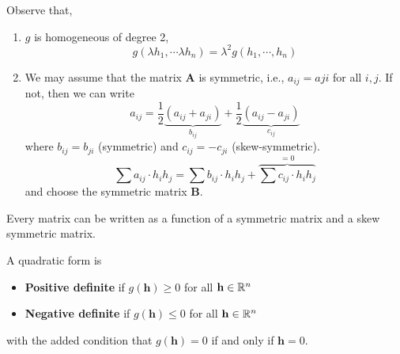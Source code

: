 \begin{prop}
    Observe that,
    \begin{enumerate}
        \item $g$ is homogeneous of degree 2,
        \[g(\lambda h_1, \cdots \lambda h_n) = \lambda^2 g(h_1, \cdots, h_n)\]
        \item We may assume that the matrix $\mathbf{A}$ is symmetric, i.e., $a_{ij} = a{ji}$ for all $i, j$. If not, then we can write
        \[a_{ij} = \frac{1}{2}\underbrace{(a_{ij} + a_{ji})}_{b_{ij}} + \frac{1}{2}\underbrace{(a_{ij} - a_{ji})}_{c_{ij}}\]
        where $b_{ij} = b_{ji}$ (symmetric) and $c_{ij} = -c_{ji}$ (skew-symmetric).
        \[\sum a_{i j} \cdot h_i h_j=\sum b_{i j} \cdot h_i h_j+\overbrace{\sum c_{i j} \cdot h_i h_j}^{=0}\]
        and choose the symmetric matrix $\mathbf{B}$.
    \end{enumerate}
\end{prop}

\begin{marginfigure}
    Every matrix can be written as a function of a symmetric matrix and a skew symmetric matrix.
\end{marginfigure}

\begin{defn}
     A quadratic form is
     \begin{itemize}
         \item \textbf{Positive definite} if $g(\mathbf{h}) \geq 0$ for all $\mathbf{h} \in \mathbb{R}^n$
         \item \textbf{Negative definite} if $g(\mathbf{h}) \leq 0$ for all $\mathbf{h} \in \mathbb{R}^n$
     \end{itemize}
     with the added condition that $g(\mathbf{h}) = 0$ if and only if $\mathbf{h} = 0$.
\end{defn}

